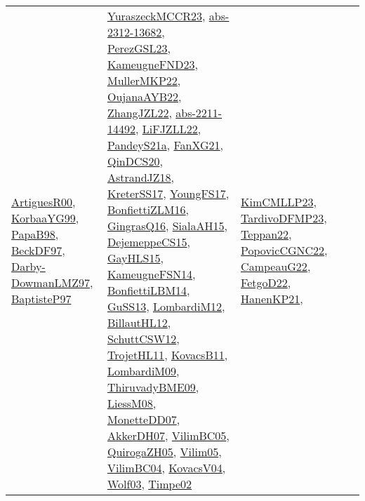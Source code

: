 {\begin{longtable}{lp{3cm}>{\raggedright}p{6cm}>{\raggedright}p{6cm}p{8cm}}
\href{articles/ArtiguesR00.pdf}{ArtiguesR00}\cite{ArtiguesR00}, \href{papers/KorbaaYG99.pdf}{KorbaaYG99}\cite{KorbaaYG99}, \href{articles/PapaB98.pdf}{PapaB98}\cite{PapaB98}, \href{papers/BeckDF97.pdf}{BeckDF97}\cite{BeckDF97}, \href{articles/Darby-DowmanLMZ97.pdf}{Darby-DowmanLMZ97}\cite{Darby-DowmanLMZ97}, \href{papers/BaptisteP97.pdf}{BaptisteP97}\cite{BaptisteP97} & \href{articles/YuraszeckMCCR23.pdf}{YuraszeckMCCR23}\cite{YuraszeckMCCR23}, \href{articles/abs-2312-13682.pdf}{abs-2312-13682}\cite{abs-2312-13682}, \href{papers/PerezGSL23.pdf}{PerezGSL23}\cite{PerezGSL23}, \href{papers/KameugneFND23.pdf}{KameugneFND23}\cite{KameugneFND23}, \href{articles/MullerMKP22.pdf}{MullerMKP22}\cite{MullerMKP22}, \href{papers/OujanaAYB22.pdf}{OujanaAYB22}\cite{OujanaAYB22}, \href{papers/ZhangJZL22.pdf}{ZhangJZL22}\cite{ZhangJZL22}, \href{articles/abs-2211-14492.pdf}{abs-2211-14492}\cite{abs-2211-14492}, \href{papers/LiFJZLL22.pdf}{LiFJZLL22}\cite{LiFJZLL22}, \href{articles/PandeyS21a.pdf}{PandeyS21a}\cite{PandeyS21a}, \href{articles/FanXG21.pdf}{FanXG21}\cite{FanXG21}, \href{articles/QinDCS20.pdf}{QinDCS20}\cite{QinDCS20}, \href{papers/AstrandJZ18.pdf}{AstrandJZ18}\cite{AstrandJZ18}, \href{articles/KreterSS17.pdf}{KreterSS17}\cite{KreterSS17}, \href{papers/YoungFS17.pdf}{YoungFS17}\cite{YoungFS17}, \href{papers/BonfiettiZLM16.pdf}{BonfiettiZLM16}\cite{BonfiettiZLM16}, \href{papers/GingrasQ16.pdf}{GingrasQ16}\cite{GingrasQ16}, \href{papers/SialaAH15.pdf}{SialaAH15}\cite{SialaAH15}, \href{papers/DejemeppeCS15.pdf}{DejemeppeCS15}\cite{DejemeppeCS15}, \href{papers/GayHLS15.pdf}{GayHLS15}\cite{GayHLS15}, \href{articles/KameugneFSN14.pdf}{KameugneFSN14}\cite{KameugneFSN14}, \href{articles/BonfiettiLBM14.pdf}{BonfiettiLBM14}\cite{BonfiettiLBM14}, \href{papers/GuSS13.pdf}{GuSS13}\cite{GuSS13}, \href{articles/LombardiM12.pdf}{LombardiM12}\cite{LombardiM12}, \href{papers/BillautHL12.pdf}{BillautHL12}\cite{BillautHL12}, \href{papers/SchuttCSW12.pdf}{SchuttCSW12}\cite{SchuttCSW12}, \href{articles/TrojetHL11.pdf}{TrojetHL11}\cite{TrojetHL11}, \href{articles/KovacsB11.pdf}{KovacsB11}\cite{KovacsB11}, \href{papers/LombardiM09.pdf}{LombardiM09}\cite{LombardiM09}, \href{papers/ThiruvadyBME09.pdf}{ThiruvadyBME09}\cite{ThiruvadyBME09}, \href{articles/LiessM08.pdf}{LiessM08}\cite{LiessM08}, \href{papers/MonetteDD07.pdf}{MonetteDD07}\cite{MonetteDD07}, \href{papers/AkkerDH07.pdf}{AkkerDH07}\cite{AkkerDH07}, \href{articles/VilimBC05.pdf}{VilimBC05}\cite{VilimBC05}, \href{papers/QuirogaZH05.pdf}{QuirogaZH05}\cite{QuirogaZH05}, \href{papers/Vilim05.pdf}{Vilim05}\cite{Vilim05}, \href{papers/VilimBC04.pdf}{VilimBC04}\cite{VilimBC04}, \href{papers/KovacsV04.pdf}{KovacsV04}\cite{KovacsV04}, \href{papers/Wolf03.pdf}{Wolf03}\cite{Wolf03}, \href{articles/Timpe02.pdf}{Timpe02}\cite{Timpe02} & \href{papers/KimCMLLP23.pdf}{KimCMLLP23}\cite{KimCMLLP23}, \href{papers/TardivoDFMP23.pdf}{TardivoDFMP23}\cite{TardivoDFMP23}, \href{papers/Teppan22.pdf}{Teppan22}\cite{Teppan22}, \href{papers/PopovicCGNC22.pdf}{PopovicCGNC22}\cite{PopovicCGNC22}, \href{articles/CampeauG22.pdf}{CampeauG22}\cite{CampeauG22}, \href{articles/FetgoD22.pdf}{FetgoD22}\cite{FetgoD22}, \href{papers/HanenKP21.pdf}{HanenKP21}\cite{HanenKP21}, 
\end{longtable}}
